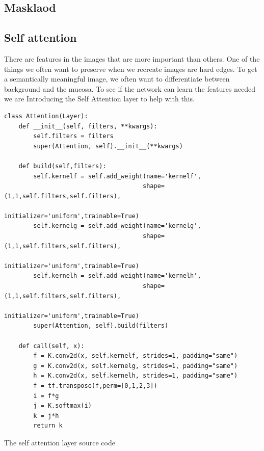 \subsection{Masklaod}
\subsection{Self attention}
There are features in the images that are more important than others. One of the things we often want to preserve when we recreate images are hard edges. To get a semantically meaningful image,  we often want to differentiate between background and the mucosa. 
To see if the network can learn the features needed we are Introducing the Self Attention layer to help with this. 


\begin{listing}[h]
\begin{verbatim}
class Attention(Layer): 
    def __init__(self, filters, **kwargs):
        self.filters = filters
        super(Attention, self).__init__(**kwargs)

    def build(self,filters):
        self.kernelf = self.add_weight(name='kernelf', 
                                      shape=(1,1,self.filters,self.filters),
                                      initializer='uniform',trainable=True)
        self.kernelg = self.add_weight(name='kernelg', 
                                      shape=(1,1,self.filters,self.filters),
                                      initializer='uniform',trainable=True)
        self.kernelh = self.add_weight(name='kernelh', 
                                      shape=(1,1,self.filters,self.filters),
                                      initializer='uniform',trainable=True)
        super(Attention, self).build(filters)

    def call(self, x):
        f = K.conv2d(x, self.kernelf, strides=1, padding="same")
        g = K.conv2d(x, self.kernelg, strides=1, padding="same")
        h = K.conv2d(x, self.kernelh, strides=1, padding="same")
        f = tf.transpose(f,perm=[0,1,2,3])
        i = f*g
        j = K.softmax(i)
        k = j*h
        return k

\end{verbatim}
\caption{The self attention layer source code}
\label{listing:Attention}
\end{listing}

